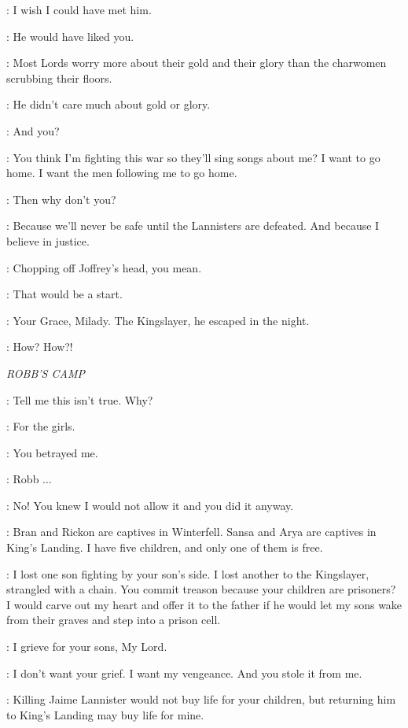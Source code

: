\TALISA: I wish I could have met him. 

\ROBB: He would have liked you. 

\TALISA: Most Lords worry more about their gold and their glory than the charwomen scrubbing their floors. 

\ROBB: He didn't care much about gold or glory. 

\TALISA: And you? 

\ROBB: You think I'm fighting this war so they'll sing songs about me? I want to go home. I want the men following me to go home. 

\TALISA: Then why don't you? 

\ROBB: Because we'll never be safe until the Lannisters are defeated. And because I believe in justice. 

\TALISA: Chopping off Joffrey's head, you mean. 

\ROBB: That would be a start. 


\MESSENGER: Your Grace, Milady. The Kingslayer, he escaped in the night. 

\ROBB: How? How?! 

\scene

\textit{ROBB'S CAMP} 


\ROBB: Tell me this isn't true. Why? 

\CATELYN: For the girls. 

\ROBB: You betrayed me. 

\CATELYN: Robb $\ldots$  

\ROBB: No! You knew I would not allow it and you did it anyway. 

\CATELYN: Bran and Rickon are captives in Winterfell. Sansa and Arya are captives in King's Landing. I have five children, and only one of them is free. 

\KARSTARK: I lost one son fighting by your son's side. I lost another to the Kingslayer, strangled with a chain. You commit treason because your children are prisoners? I would carve out my heart and offer it to the father if he would let my sons wake from their graves and step into a prison cell. 

\CATELYN: I grieve for your sons, My Lord. 

\KARSTARK: I don't want your grief. I want my vengeance. And you stole it from me. 

\CATELYN: Killing Jaime Lannister would not buy life for your children, but returning him to King's Landing may buy life for mine. 

